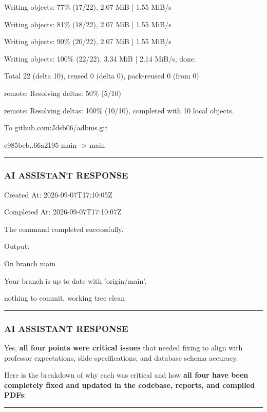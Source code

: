 \documentclass[11pt,a4paper]{article}
\begin{document}
Writing objects:  77\% (17/22), 2.07 MiB | 1.55 MiB/s

Writing objects:  81\% (18/22), 2.07 MiB | 1.55 MiB/s

Writing objects:  90\% (20/22), 2.07 MiB | 1.55 MiB/s

Writing objects: 100\% (22/22), 3.34 MiB | 2.14 MiB/s, done.

Total 22 (delta 10), reused 0 (delta 0), pack-reused 0 (from 0)

remote: Resolving deltas:  50\% (5/10)

remote: Resolving deltas: 100\% (10/10), completed with 10 local objects.

To github.com:Jdsb06/adbms.git

c985beb..66a2195  main -> main


\hrule

\subsubsection{AI ASSISTANT RESPONSE}

Created At: 2026-09-07T17:10:05Z

Completed At: 2026-09-07T17:10:07Z


The command completed successfully.

Output:

On branch main

Your branch is up to date with 'origin/main'.


nothing to commit, working tree clean


\hrule

\subsubsection{AI ASSISTANT RESPONSE}

Yes, \textbf{all four points were critical issues} that needed fixing to align with professor expectations, slide specifications, and database schema accuracy.


Here is the breakdown of why each was critical and how \textbf{all four have been completely fixed and updated in the codebase, reports, and compiled PDFs}:


\hrule
\end{document}
